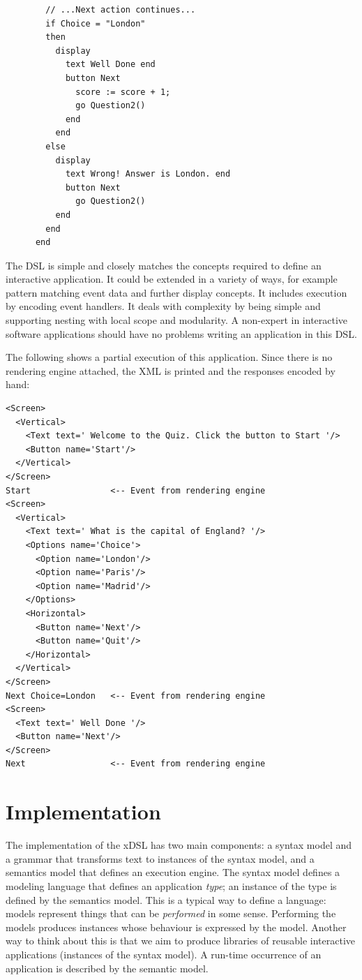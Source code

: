 \begin{lstlisting}
        // ...Next action continues...
        if Choice = "London" 
        then 
          display
            text Well Done end
            button Next
              score := score + 1;
              go Question2()
            end
          end
        else
          display
            text Wrong! Answer is London. end
            button Next
              go Question2()
          end
        end
      end
\end{lstlisting}The DSL is simple and closely matches the concepts required to define
an interactive application. It could be extended in a variety of ways,
for example pattern matching event data and further display concepts.
It includes execution by encoding event handlers. It deals with complexity
by being simple and supporting nesting with local scope and modularity.
A non-expert in interactive software applications should have no problems
writing an application in this DSL.

The following shows a partial execution of this application. Since
there is no rendering engine attached, the XML is printed and the
responses encoded by hand:

\begin{lstlisting}
<Screen>
  <Vertical>
    <Text text=' Welcome to the Quiz. Click the button to Start '/>
    <Button name='Start'/>
  </Vertical>
</Screen>
Start                <-- Event from rendering engine
<Screen>
  <Vertical>
    <Text text=' What is the capital of England? '/>
    <Options name='Choice'>
      <Option name='London'/>
      <Option name='Paris'/>
      <Option name='Madrid'/>
    </Options>
    <Horizontal>
      <Button name='Next'/>
      <Button name='Quit'/>
    </Horizontal>
  </Vertical>
</Screen>
Next Choice=London   <-- Event from rendering engine
<Screen>
  <Text text=' Well Done '/>
  <Button name='Next'/>
</Screen>
Next                 <-- Event from rendering engine
\end{lstlisting}
\section{Implementation\label{sec:Implementation}}

The implementation of the xDSL has two main components: a syntax model
and a grammar that transforms text to instances of the syntax model,
and a semantics model that defines an execution engine. The syntax
model defines a modeling language that defines an application \emph{type};
an instance of the type is defined by the semantics model. This is
a typical way to define a language: models represent things that can
be \emph{performed} in some sense. Performing the models produces
instances whose behaviour is expressed by the model. Another way to
think about this is that we aim to produce libraries of reusable interactive
applications (instances of the syntax model). A run-time occurrence
of an application is described by the semantic model.

